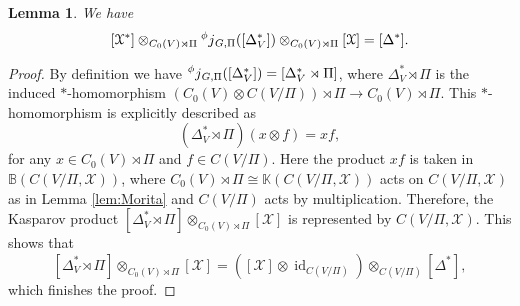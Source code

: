 \documentclass[11pt]{amsart}
\theoremstyle{definition}
\theoremstyle{plain}
\newtheorem{lem}[equation]{Lemma}
\theoremstyle{remark}
\DeclareMathOperator{\id}{id}
\newcommand{\bB}{\mathbb{B}}
\newcommand{\bK}{\mathbb{K}}
\newcommand{\cX}{\mathcal{X}}
\begin{document}
\begin{lem}\label{lem:delta}
We have 
\[ [\cX^*] \otimes_{C_0(V) \rtimes \Pi } \prescript{\phi}{}j_{G,\Pi} ([\Delta_V ^*]) \otimes_{C_0(V) \rtimes \Pi } [\cX] =[\Delta ^*]. \]
\end{lem}
\begin{proof}
By definition we have $\prescript{\phi}{} j_{G,\Pi} ([\Delta_V^*]) = [\Delta_V^* \rtimes \Pi]$, where $\Delta_V^* \rtimes \Pi$ is the induced $\ast$-homomorphism $(C_0(V) \otimes C(V/\Pi)) \rtimes \Pi \to C_0(V) \rtimes \Pi$. This $\ast$-homomorphism is explicitly described as
\[ (\Delta_V^* \rtimes \Pi)(x \otimes f) = xf, \]
for any $x \in C_0(V) \rtimes \Pi$ and $f \in C(V/\Pi)$. 
Here the product $xf$ is taken in $\bB(C(V/\Pi , \cX ))$, where $C_0(V) \rtimes \Pi  \cong \bK(C(V/\Pi, \cX ) )$ acts on $C(V/\Pi, \cX)$ as in Lemma \ref{lem:Morita} and $C(V/\Pi)$ acts by multiplication. 
Therefore, the Kasparov product 
$[\Delta_V^* \rtimes \Pi] \otimes_{C_0(V) \rtimes \Pi} [\cX] $ is represented by 
$ C(V/\Pi, \cX ) $. This shows that 
\[[\Delta_V^* \rtimes \Pi] \otimes_{C_0(V) \rtimes \Pi}[\cX] = ([\cX] \otimes \id_{C(V/\Pi)}) \otimes_{C(V/\Pi)} [\Delta^*], \]
which finishes the proof.
\end{proof}
\end{document}
